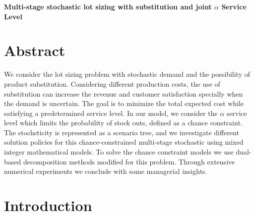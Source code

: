 \documentclass[10pt]{article}
\def\Title#1{\begin{center} {\Large {\bf #1} } \end{center}}
\begin{document}
\Title{Multi-stage stochastic lot sizing with substitution and joint $\alpha$ Service Level }

\bigskip\bigskip














\section{Abstract}

We consider the lot sizing problem with stochastic demand and the possibility of product substitution. Considering different production costs, the use of substitution can increase the revenue and customer satisfaction specially when the demand is uncertain. The goal is to minimize the total expected cost while satisfying a predetermined service level. In our model, we consider the $\alpha$ service level which limits the probability of stock outs, defined as a chance constraint. The stochsticity is represented as a scenario tree, and we investigate different solution policies for this chance-constrained multi-stage stochastic using mixed integer mathematical models. To solve the chance constraint models we use dual-based decomposition methods modified for this problem. Through extensive numerical experiments we conclude with some managerial insights. 

\section{Introduction}
\end{document}
